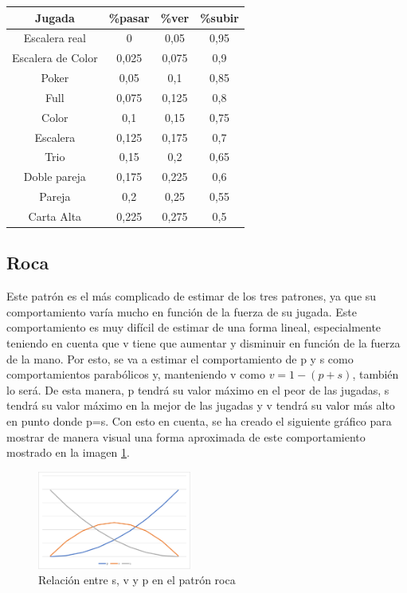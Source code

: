 \begin{longtable}[c]{|c|c|c|c|}
\hline
\rowcolor{lightgray}Jugada & \%pasar & \%ver & \%subir \\
\hline
Escalera real & 0 & 0,05 & 0,95 \\
\hline
Escalera de Color & 0,025 & 0,075 & 0,9 \\
\hline
Poker & 0,05 & 0,1 & 0,85 \\
\hline
Full & 0,075 & 0,125 & 0,8 \\
\hline
Color & 0,1 & 0,15 & 0,75 \\
\hline
Escalera & 0,125 & 0,175 & 0,7 \\
\hline
Trio & 0,15 & 0,2 & 0,65 \\
\hline
Doble pareja & 0,175 & 0,225 & 0,6 \\
\hline
Pareja & 0,2 & 0,25 & 0,55\\
\hline
Carta Alta & 0,225 & 0,275 & 0,5\\
\hline
\end{longtable}

\subsection{Roca}

Este patrón es el más complicado de estimar de los tres patrones, ya que su comportamiento varía mucho en función de la fuerza de su jugada. Este comportamiento es muy difícil de estimar de una forma lineal, especialmente teniendo en cuenta que v tiene que aumentar y disminuir en función de la fuerza de la mano.
Por esto, se va a estimar el comportamiento de p y s como comportamientos parabólicos y, manteniendo v como $v=1-(p+s)$, también lo será. 
De esta manera, p tendrá su valor máximo en el peor de las jugadas, s tendrá su valor máximo en la mejor de las jugadas y v tendrá su valor más alto en punto donde p=s.
Con esto en cuenta, se ha creado el siguiente gráfico para mostrar de manera visual una forma aproximada de este comportamiento mostrado en la imagen \ref{fig:roca}.

\begin{figure}[h]
\centering
\includegraphics[width=0.45\textwidth]{figuras/roca.png}   
\caption{Relación entre s, v y p en el patrón roca\cite{propiaExcel}}
\label{fig:roca}
\end{figure}



